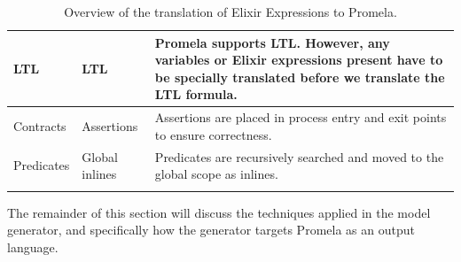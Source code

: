 \begin{longtable}{|>{\raggedright\arraybackslash}p{4cm}|>{\raggedright\arraybackslash}p{4cm}|>{\raggedright\arraybackslash}p{6cm}|}
        \hline
        LTL & LTL & Promela supports LTL. However, any variables or Elixir expressions present have to be specially translated before we translate the LTL formula. \\
        \hline
        Contracts & Assertions & Assertions are placed in process entry and exit points to ensure correctness. \\
        \hline
        Predicates & Global inlines & Predicates are recursively searched and moved to the global scope as inlines. \\
        \hline
    \caption{Overview of the translation of Elixir Expressions to Promela.}
    \label{table:translation}
\end{longtable}
The remainder of this section will discuss the techniques applied in the model generator, and specifically how the generator targets Promela as an output language.
